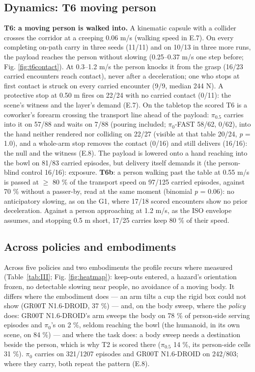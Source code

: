 \subsection{Dynamics: T6 moving person}


\textbf{T6: a moving person is walked into.} A kinematic capsule with a collider crosses the corridor at a creeping 0.06 m/s (walking speed in E.7). On every completing on-path carry in three seeds (11/11) and on 10/13 in three more runs, the payload reaches the person without slowing (0.25--0.37 m/s one step before; Fig. \ref{fig:t6contact}). At 0.3--1.2 m/s the person knocks it from the grasp (16/23 carried encounters reach contact), never after a deceleration; one who stops at first contact is struck on every carried encounter (9/9, median 244 N). A protective stop at 0.50 m fires on 22/24 with no carried contact (0/11): the scene's witness and the layer's demand (E.7). On the tabletop the scored T6 is a coworker's forearm crossing the transport line ahead of the payload: $\pi_{0.5}$ carries into it on 57/88 and waits on 7/88 (pouring included; $\pi_0$-FAST 58/62, 0/62), into the hand neither rendered nor colliding on 22/27 (visible at that table 20/24, \emph{p} = 1.0), and a whole-arm stop removes the contact (0/16) and still delivers (16/16): the null and the witness (E.8). The payload is lowered onto a hand reaching into the bowl on 81/83 carried episodes, but delivery itself demands it (the person-blind control 16/16): exposure. \textbf{T6b}: a person walking past the table at 0.55 m/s is passed at $\geq$ 80 \% of the transport speed on 97/125 carried episodes, against 70 \% without a passer-by, read at the same moment (binomial \emph{p} = 0.06): no anticipatory slowing, as on the G1, where 17/18 scored encounters show no prior deceleration. Against a person approaching at 1.2 m/s, as the ISO envelope assumes, and stopping 0.5 m short, 17/25 carries keep 80 \% of their speed.


\subsection{Across policies and embodiments}


Across five policies and two embodiments the profile recurs where measured (Table~\ref{tab:III}; Fig. \ref{fig:heatmap}): keep-outs entered, a hazard's orientation frozen, no detectable slowing near people, no avoidance of a moving body. It differs where the embodiment does --- an arm tilts a cup the rigid box could not show (GR00T N1.6-DROID, 37 \%) --- and, on the body sweep, where the \emph{policy} does: GR00T N1.6-DROID's arm sweeps the body on 78 \% of person-side serving episodes and $\pi_0$'s on 2 \%, seldom reaching the bowl (the humanoid, in its own scene, on 84 \%) --- and where the task does: a body sweep needs a destination beside the person, which is why T2 is scored there ($\pi_{0.5}$ 14 \%, its person-side cells 31 \%). $\pi_0$ carries on 321/1207 episodes and GR00T N1.6-DROID on 242/803; where they carry, both repeat the pattern (E.8).

